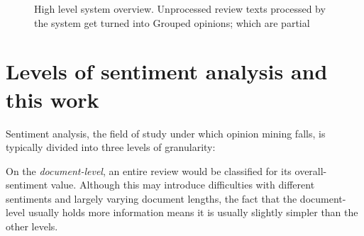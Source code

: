 \documentclass[a4paper,11pt]{kth-mag}
\begin{document}
\begin{figure}[t]
  \centering
  \caption{High level system overview. Unprocessed review texts processed by the system
    get turned into Grouped opinions; which are partial }
  \label{fig:overview}
\end{figure}



\clearpage

\newpage
\section{Levels of sentiment analysis and this work}
Sentiment analysis, the field of study under which opinion mining falls,
is typically divided into three levels of granularity:

On the \emph{document-level}, an entire review would be classified for
its overall-sentiment value\cite[Chapter~1.2]{liu2012sentiment}.
Although this may introduce difficulties with different sentiments
and largely varying document lengths, the fact that the document-level usually holds more information
means it is usually slightly simpler than the other levels.
\end{document}
